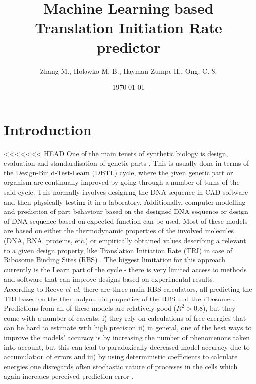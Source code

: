 \documentclass{article}
\title{Machine Learning based Translation Initiation Rate predictor}
\author{Zhang M., Holowko M. B., Hayman Zumpe H., Ong, C. S.}
\date{\today{}}
\begin{document}
\maketitle

\section{Introduction}

<<<<<<< HEAD
One of the main tenets of synthetic biology is design, evaluation and standardisation of genetic parts \cite{Brophy2014,Canton2008,Stanton2014}. This is usually done in terms of the Design-Build-Test-Learn (DBTL) cycle, where the given genetic part or organism are continually improved by going through a number of turns of the said cycle. This normally involves designing the DNA sequence in CAD software and then physically testing it in a laboratory. Additionally, computer modelling and prediction of part behaviour based on the designed DNA sequence or design of DNA sequence based on expected function can be used\cite{Yeoh2019,Nielsen2016}. Most of these models are based on either the thermodynamic properties of the involved molecules (DNA, RNA, proteins, etc.) or empirically obtained values describing a relevant to a given design property, like Translation Initiation Rate (TRI) in case of Ribosome Binding Sites (RBS) \cite{Xia1998,Chen2013,Reeve2014}. The biggest limitation for this approach currently is the Learn part of the cycle - there is very limited access to methods and software that can improve designs based on experimental results.\\
According to Reeve \emph{et al.} there are three main RBS calculators, all predicting the TRI based on the thermodynamic properties of the RBS and the ribosome \cite{Seo2013,Na2010,Salis2009}. 
Predictions from all of these models are relatively good ($R^2 >0.8$), but they come with a number of caveats: i) they rely on calculations of free energies that can be hard to estimate with high precision ii) in general, one of the best ways to improve the models' accuracy is by increasing the number of phenomenons taken into account, but this can lead to paradoxically decreased model accuracy due to accumulation of errors \cite{EspahBorujeni2016} and iii) by using deterministic coefficients to calculate energies one disregards often stochastic nature of processes in the cells which again increases perceived prediction error \cite{Goss1998}. \\
\end{document}
